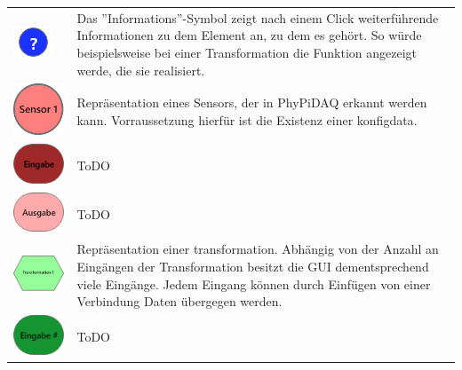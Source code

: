 \documentclass[parskip=full]{scrartcl}
\begin{document}
\begin{tabular}[t]{p{1cm} p{10cm}}
	\vspace{0cm}\includegraphics[width = 1 cm]{Grafik/Information.png} & Das ''Informations''-Symbol zeigt nach einem Click weiterführende Informationen zu dem Element an, zu dem es gehört. So würde beispielsweise bei einer Transformation die Funktion angezeigt werde, die sie realisiert.\newline\\
	\vspace{0cm}\includegraphics[width = 1 cm]{Grafik/Sensorelement.png} & Repräsentation eines Sensors, der in PhyPiDAQ erkannt werden kann. Vorraussetzung hierfür ist die Existenz einer \gls{konfigdata}.\newline\\
	\vspace{0cm}\includegraphics[width = 1 cm]{Grafik/Eingabe-Sensor.png} & ToDO\\
	\vspace{0cm}\includegraphics[width = 1 cm]{Grafik/Ausgabe-Sensor.png} & ToDO\\
	\vspace{0cm}\includegraphics[width = 1 cm]{Grafik/Verbindungselement.png} & Repräsentation einer \gls{transformation}. Abhängig von der Anzahl an Eingängen der Transformation besitzt die GUI dementsprechend viele Eingänge. Jedem Eingang können durch Einfügen von einer Verbindung Daten übergegen werden.\newline \\
	\vspace{0cm}\includegraphics[width = 1 cm]{Grafik/Eingabe-Verbindung.png} & ToDO\\

\end{tabular}
\end{document}
